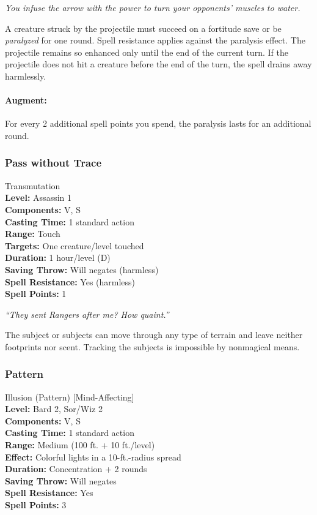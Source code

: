 \emph{You infuse the arrow with the power to turn your opponents' muscles to water.}

A creature struck by the projectile must succeed on a fortitude save or be \emph{paralyzed} for one round.
Spell resistance applies against the paralysis effect.
The projectile remains so enhanced only until the end of the current turn. 
If the projectile does not hit a creature before the end of the turn, the spell drains away harmlessly.

\paragraph{Augment:} For every 2 additional spell points you spend, the paralysis lasts for an additional round.
\subsubsection{Pass without Trace}
\label{Spell:PassWithoutTrace}
Transmutation
\\ \textbf{Level:} Assassin 1
\\ \textbf{Components:} V, S
\\ \textbf{Casting Time:} 1 standard action
\\ \textbf{Range:} Touch
\\ \textbf{Targets:} One creature/level touched
\\ \textbf{Duration:} 1 hour/level (D)
\\ \textbf{Saving Throw:} Will negates (harmless)
\\ \textbf{Spell Resistance:} Yes (harmless)
\\ \textbf{Spell Points:} 1

\emph{``They sent Rangers after me? How quaint.''}

The subject or subjects can move through any type of terrain and leave neither footprints nor scent. 
Tracking the subjects is impossible by nonmagical means.
\subsubsection{Pattern} 
\label{Spell:Pattern}
Illusion (Pattern) [Mind-Affecting]
\\ \textbf{Level:} Bard 2, Sor/Wiz 2
\\ \textbf{Components:} V, S
\\ \textbf{Casting Time:} 1 standard action
\\ \textbf{Range:} Medium (100 ft. + 10 ft./level)
\\ \textbf{Effect:} Colorful lights in a 10-ft.-radius spread
\\ \textbf{Duration:} Concentration + 2 rounds
\\ \textbf{Saving Throw:} Will negates
\\ \textbf{Spell Resistance:} Yes
\\ \textbf{Spell Points:} 3

